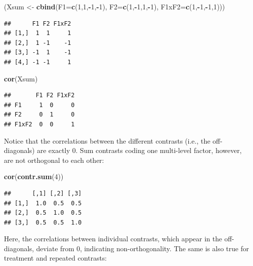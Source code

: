 \documentclass[12pt,]{krantz}
\newenvironment{Shaded}{\begin{snugshade}}{\end{snugshade}}
\newcommand{\DataTypeTok}[1]{\textcolor[rgb]{0.13,0.29,0.53}{#1}}
\newcommand{\DecValTok}[1]{\textcolor[rgb]{0.00,0.00,0.81}{#1}}
\newcommand{\KeywordTok}[1]{\textcolor[rgb]{0.13,0.29,0.53}{\textbf{#1}}}
\newcommand{\NormalTok}[1]{#1}
\newcommand{\OperatorTok}[1]{\textcolor[rgb]{0.81,0.36,0.00}{\textbf{#1}}}
\newcommand{\StringTok}[1]{\textcolor[rgb]{0.31,0.60,0.02}{#1}}
\begin{document}
\begin{Shaded}
\begin{Highlighting}[]
\NormalTok{(Xsum <-}\StringTok{ }\KeywordTok{cbind}\NormalTok{(}\DataTypeTok{F1=}\KeywordTok{c}\NormalTok{(}\DecValTok{1}\NormalTok{,}\DecValTok{1}\NormalTok{,}\OperatorTok{-}\DecValTok{1}\NormalTok{,}\OperatorTok{-}\DecValTok{1}\NormalTok{), }\DataTypeTok{F2=}\KeywordTok{c}\NormalTok{(}\DecValTok{1}\NormalTok{,}\OperatorTok{-}\DecValTok{1}\NormalTok{,}\DecValTok{1}\NormalTok{,}\OperatorTok{-}\DecValTok{1}\NormalTok{), }\DataTypeTok{F1xF2=}\KeywordTok{c}\NormalTok{(}\DecValTok{1}\NormalTok{,}\OperatorTok{-}\DecValTok{1}\NormalTok{,}\OperatorTok{-}\DecValTok{1}\NormalTok{,}\DecValTok{1}\NormalTok{)))}
\end{Highlighting}
\end{Shaded}

\begin{verbatim}
##      F1 F2 F1xF2
## [1,]  1  1     1
## [2,]  1 -1    -1
## [3,] -1  1    -1
## [4,] -1 -1     1
\end{verbatim}

\begin{Shaded}
\begin{Highlighting}[]
\KeywordTok{cor}\NormalTok{(Xsum)}
\end{Highlighting}
\end{Shaded}

\begin{verbatim}
##       F1 F2 F1xF2
## F1     1  0     0
## F2     0  1     0
## F1xF2  0  0     1
\end{verbatim}

\noindent
Notice that the correlations between the different contrasts (i.e., the off-diagonals) are exactly \(0\). Sum contrasts coding one multi-level factor, however, are not orthogonal to each other:

\begin{Shaded}
\begin{Highlighting}[]
\KeywordTok{cor}\NormalTok{(}\KeywordTok{contr.sum}\NormalTok{(}\DecValTok{4}\NormalTok{))}
\end{Highlighting}
\end{Shaded}

\begin{verbatim}
##      [,1] [,2] [,3]
## [1,]  1.0  0.5  0.5
## [2,]  0.5  1.0  0.5
## [3,]  0.5  0.5  1.0
\end{verbatim}

\noindent
Here, the correlations between individual contrasts, which appear in the off-diagonals, deviate from \(0\), indicating non-orthogonality. The same is also true for treatment and repeated contrasts:
\end{document}
